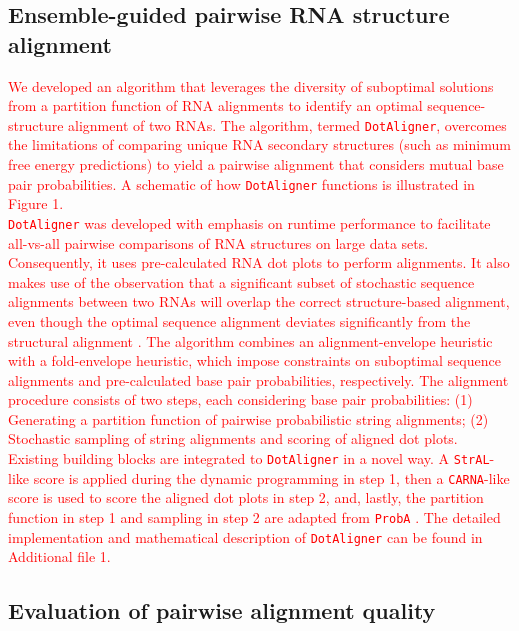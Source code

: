 \documentclass{bmcart}
\newcommand\dotaligner{\texttt{DotAligner}}
\newcommand\carna{\texttt{CARNA}}
\begin{document}
\subsection*{Ensemble-guided pairwise RNA structure alignment} 
 
\textcolor{red}{
We developed an algorithm that leverages the diversity of suboptimal solutions from a partition
function of RNA alignments to identify an optimal sequence-structure alignment
of two RNAs. The algorithm, termed  \dotaligner{}, overcomes the limitations of comparing unique RNA
secondary structures (such as minimum free energy predictions) to yield a
pairwise alignment that considers mutual base pair probabilities. 
A schematic of how \dotaligner{} functions is illustrated in Figure 1.} \\

\textcolor{red}{
\dotaligner{} was developed with emphasis on runtime performance to 
facilitate all-vs-all pairwise comparisons of RNA structures on large data sets. 
Consequently, it uses pre-calculated RNA dot plots to perform alignments. 
It also makes use of the observation that a significant subset of stochastic sequence alignments 
 between two RNAs will overlap the correct structure-based alignment, even though 
 the optimal sequence alignment deviates significantly from the structural alignment \cite{Muckstein12385998}. 
The algorithm combines an alignment-envelope heuristic with a fold-envelope 
heuristic, which impose constraints on suboptimal sequence alignments and  
pre-calculated base pair probabilities, respectively. 
The alignment procedure consists of two steps, each considering base pair probabilities:
(1) Generating a partition function of pairwise probabilistic string alignments; 
(2) Stochastic sampling of string alignments and scoring of aligned dot plots.
Existing building blocks are integrated to \dotaligner{} in a novel way. 
A \texttt{StrAL}-like score is applied during the dynamic programming in step 1, 
then a \carna-like score is used to score the aligned dot plots in step 2, 
and, lastly, the partition function in step 1 and sampling in step 2 are adapted
from \texttt{ProbA} \cite{Muckstein12385998}. The detailed implementation 
and mathematical description of \dotaligner{} can be found in Additional file 1.\\
}

\subsection*{Evaluation of pairwise alignment quality}
\end{document}
